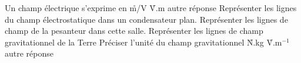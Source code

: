 \q
Un champ électrique s'exprime en 
\r
m/V
\r
V.m
\rv
autre réponse
\q
Représenter les lignes du champ électrostatique dans un condensateur plan.
\q
Représenter les lignes de champ de la pesanteur dans cette salle.
\q
Représenter les lignes de champ gravitationnel de la Terre
\q
Préciser l'unité du champ gravitationnel
\r
N.kg
\r
V.m$^{-1}$
\rv
autre réponse


